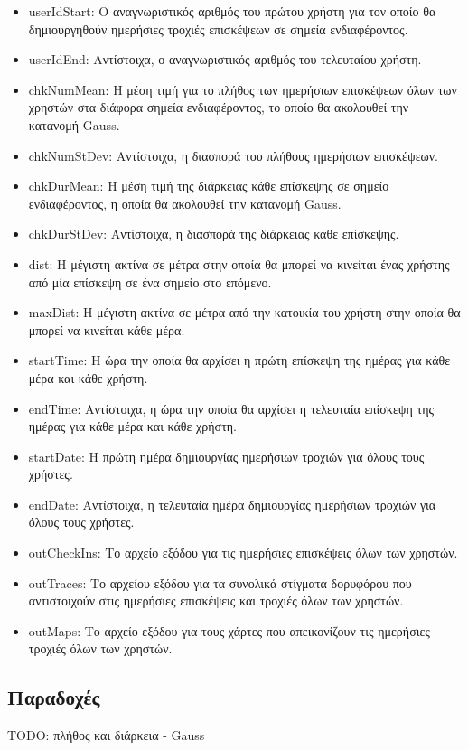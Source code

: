 \begin{itemize}
 \item userIdStart: Ο αναγνωριστικός αριθμός του πρώτου χρήστη για τον οποίο θα δημιουργηθούν ημερήσιες τροχιές επισκέψεων σε σημεία ενδιαφέροντος.
 \item userIdEnd: Αντίστοιχα, ο αναγνωριστικός αριθμός του τελευταίου χρήστη.
 \item chkNumMean: Η μέση τιμή για το πλήθος των ημερήσιων επισκέψεων όλων των χρηστών στα διάφορα σημεία ενδιαφέροντος, το οποίο θα ακολουθεί την κατανομή Gauss.
 \item chkNumStDev: Αντίστοιχα, η διασπορά του πλήθους ημερήσιων επισκέψεων.
 \item chkDurMean: Η μέση τιμή της διάρκειας κάθε επίσκεψης σε σημείο ενδιαφέροντος, η οποία θα ακολουθεί την κατανομή Gauss.
 \item chkDurStDev: Αντίστοιχα, η διασπορά της διάρκειας κάθε επίσκεψης.
 \item dist: Η μέγιστη ακτίνα σε μέτρα στην οποία θα μπορεί να κινείται ένας χρήστης από μία επίσκεψη σε ένα σημείο στο επόμενο.
 \item maxDist: Η μέγιστη ακτίνα σε μέτρα από την κατοικία του χρήστη στην οποία θα μπορεί να κινείται κάθε μέρα.
 \item startTime: Η ώρα την οποία θα αρχίσει η πρώτη επίσκεψη της ημέρας για κάθε μέρα και κάθε χρήστη.
 \item endTime: Αντίστοιχα, η ώρα την οποία θα αρχίσει η τελευταία επίσκεψη της ημέρας για κάθε μέρα και κάθε χρήστη.
 \item startDate: Η πρώτη ημέρα δημιουργίας ημερήσιων τροχιών για όλους τους χρήστες.
 \item endDate: Αντίστοιχα, η τελευταία ημέρα δημιουργίας ημερήσιων τροχιών για όλους τους χρήστες.
 \item outCheckIns: Το αρχείο εξόδου για τις ημερήσιες επισκέψεις όλων των χρηστών.
 \item outTraces: Το αρχείου εξόδου για τα συνολικά στίγματα δορυφόρου που αντιστοιχούν στις ημερήσιες επισκέψεις και τροχιές όλων των χρηστών.
 \item outMaps: Το αρχείο εξόδου για τους χάρτες που απεικονίζουν τις ημερήσιες τροχιές όλων των χρηστών. 
\end{itemize}

\subsection{Παραδοχές}

TODO: πλήθος και διάρκεια - Gauss









